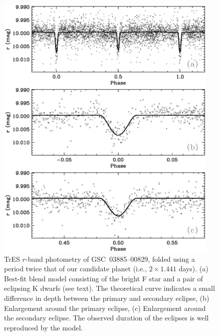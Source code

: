 \begin{figure}
\begin{center}
\includegraphics[width=0.95\textwidth]{3_f6}
\caption[$r$-band photometry modeled as an F/K+K blend]{TrES $r$-band photometry of \mbox{GSC 03885--00829}, folded
  using a period twice that of our candidate planet (i.e., $2 \times
  1.441$ days). (a) Best-fit blend model consisting of the bright F
  star and a pair of eclipsing K dwarfs (see text). The theoretical
  curve indicates a small difference in depth between the primary and
  secondary eclipse, (b) Enlargement around the primary eclipse, (c)
  Enlargement around the secondary eclipse. The observed duration of
  the eclipses is well reproduced by the model.}\label{cha:gsc:fig:MMmodel}
\end{center}
\end{figure}

